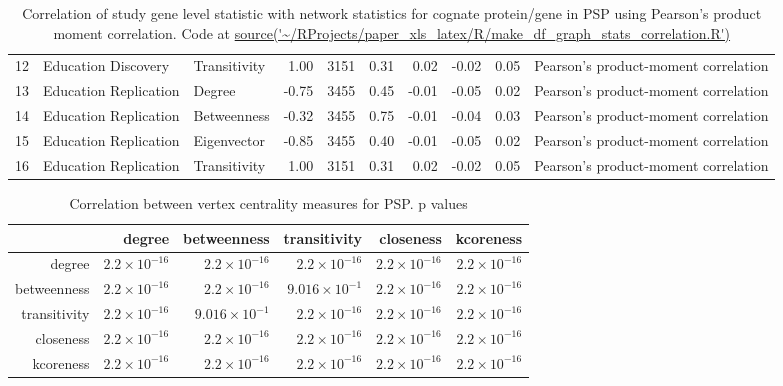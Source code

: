 \begin{table}[ht]
\begin{tabular}{rllrlrrrrl}
  12 & Education Discovery & Transitivity & 1.00 & 3151 & 0.31 & 0.02 & -0.02 & 0.05 & Pearson's product-moment correlation \\ 
  13 & Education Replication & Degree & -0.75 & 3455 & 0.45 & -0.01 & -0.05 & 0.02 & Pearson's product-moment correlation \\ 
  14 & Education Replication & Betweenness & -0.32 & 3455 & 0.75 & -0.01 & -0.04 & 0.03 & Pearson's product-moment correlation \\ 
  15 & Education Replication & Eigenvector & -0.85 & 3455 & 0.40 & -0.01 & -0.05 & 0.02 & Pearson's product-moment correlation \\ 
  16 & Education Replication & Transitivity & 1.00 & 3151 & 0.31 & 0.02 & -0.02 & 0.05 & Pearson's product-moment correlation \\ 
   \hline
\end{tabular}
\caption{Correlation of study gene level statistic with network statistics for cognate protein/gene in PSP using Pearson's product moment correlation. Code at \url{source('~/RProjects/paper_xls_latex/R/make_df_graph_stats_correlation.R')}}
\end{table}

\begin{table}[ht]
\centering
\begin{tabular}{rrrrrr}
  \hline
 & degree & betweenness & transitivity & closeness & kcoreness \\ 
  \hline
degree & $2.2 \times 10^{-16}$ & $2.2 \times 10^{-16}$ & $2.2 \times 10^{-16}$ & $2.2 \times 10^{-16}$ & $2.2 \times 10^{-16}$ \\ 
  betweenness & $2.2 \times 10^{-16}$ & $2.2 \times 10^{-16}$ & $9.016 \times 10^{-1}$ & $2.2 \times 10^{-16}$ & $2.2 \times 10^{-16}$ \\ 
  transitivity & $2.2 \times 10^{-16}$ & $9.016 \times 10^{-1}$ & $2.2 \times 10^{-16}$ & $2.2 \times 10^{-16}$ & $2.2 \times 10^{-16}$ \\ 
  closeness & $2.2 \times 10^{-16}$ & $2.2 \times 10^{-16}$ & $2.2 \times 10^{-16}$ & $2.2 \times 10^{-16}$ & $2.2 \times 10^{-16}$ \\ 
  kcoreness & $2.2 \times 10^{-16}$ & $2.2 \times 10^{-16}$ & $2.2 \times 10^{-16}$ & $2.2 \times 10^{-16}$ & $2.2 \times 10^{-16}$ \\ 
   \hline
\end{tabular}
\caption{Correlation between vertex centrality measures for PSP. p values} 
\label{tab:Correlation between vertex centrality measures for PSP. p values}
\end{table}
